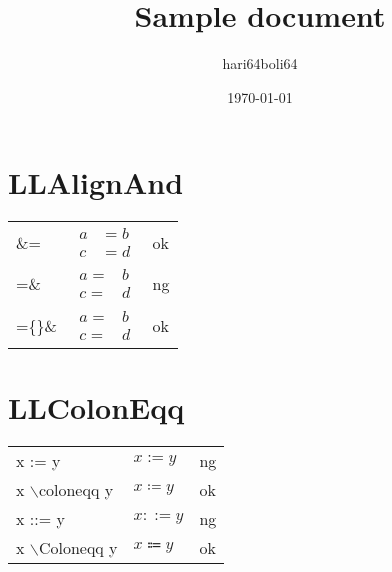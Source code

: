 \documentclass[a4paper, 10pt]{article}
\newcommand{\tA}[1]{\textcolor{cA}{#1}}
\newcommand{\tD}[1]{\textcolor{cD}{#1}}
\begin{document}
\title{Sample document}
\author{hari64boli64}
\date{\today}
\maketitle

\section{LLAlignAnd}

\begin{table}[h]
    \centering
    \begin{tabular}{lll}
        \&=              &
        $\begin{aligned}
                 a & = b \\
                 c & = d
             \end{aligned}$ &
        \tA{ok}            \\[0.3cm]
        =\&              &
        $\begin{aligned}
                 a = & b \\
                 c = & d
             \end{aligned}$ &
        \tD{ng}            \\[0.3cm]
        =\{\}\&          &
        $\begin{aligned}
                 a = {} & b \\
                 c = {} & d
             \end{aligned}$ &
        \tA{ok}
    \end{tabular}
\end{table}

\section{LLColonEqq}

\begin{table}[h]
    \centering
    \begin{tabular}{lll}
        x := y                   & $x := y$        & \tD{ng} \\
        x $\backslash$coloneqq y & $x \coloneqq y$ & \tA{ok} \\
        x ::= y                  & $x ::= y$       & \tD{ng} \\
        x $\backslash$Coloneqq y & $x \Coloneqq y$ & \tA{ok}
    \end{tabular}
\end{table}
\end{document}
